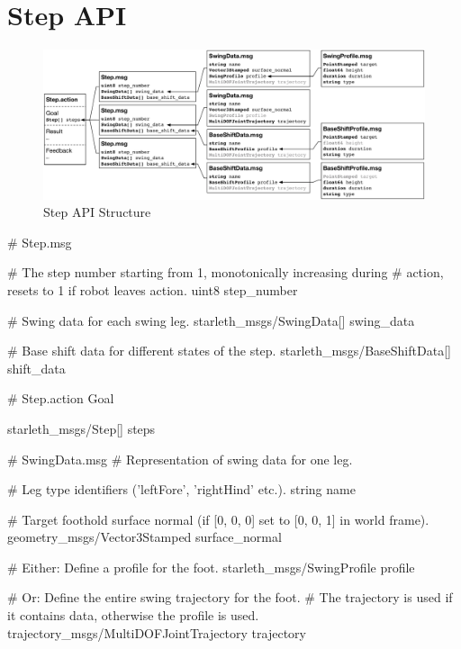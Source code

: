 \section{Step API}

\begin{figure}
	\centering
	\includegraphics[width=1.0 \textwidth]{images/step_api_structure} 
	\caption{Step API Structure}
	\label{fig:step_api_structure}
\end{figure}

\begin{code}
# Step.msg

# The step number starting from 1, monotonically increasing during
# action, resets to 1 if robot leaves action.
uint8 step_number

# Swing data for each swing leg.
starleth_msgs/SwingData[] swing_data

# Base shift data for different states of the step.
starleth_msgs/BaseShiftData[] shift_data
\end{code}

\begin{code}
# Step.action Goal

starleth_msgs/Step[] steps
\end{code}

\begin{code}
# SwingData.msg
# Representation of swing data for one leg.

# Leg type identifiers ('leftFore', 'rightHind' etc.).
string name

# Target foothold surface normal (if [0, 0, 0] set to [0, 0, 1] in world frame).
geometry_msgs/Vector3Stamped surface_normal

# Either: Define a profile for the foot.
starleth_msgs/SwingProfile profile

# Or: Define the entire swing trajectory for the foot.
# The trajectory is used if it contains data, otherwise the profile is used.
trajectory_msgs/MultiDOFJointTrajectory trajectory	
\end{code}

